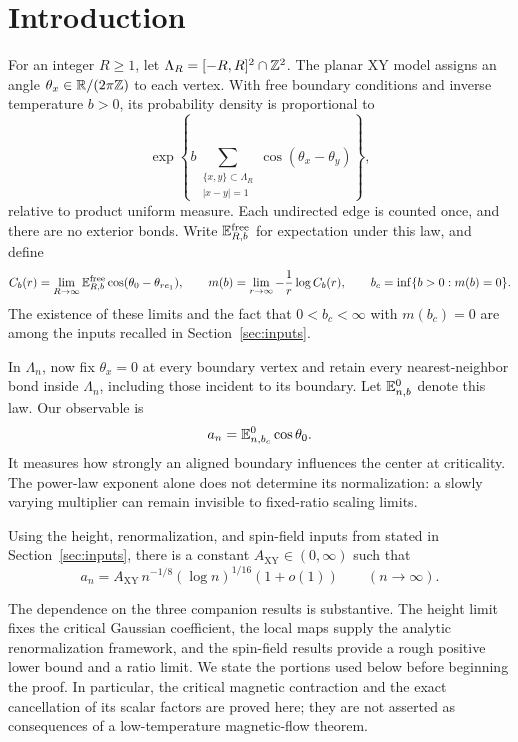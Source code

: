 \section{Introduction}\label{sec:introduction}

For an integer \(R\geq1\), let
\(\Lambda_R=[-R,R]^2\cap\mathbb Z^2\). The planar XY model assigns an angle
\(\theta_x\in\mathbb R/(2\pi\mathbb Z)\) to each vertex. With free boundary conditions
and inverse temperature \(b>0\), its probability density is proportional to
\[
 \exp\left\{b\sum_{\substack{\{x,y\}\subset\Lambda_R\\|x-y|=1}}
                      \cos(\theta_x-\theta_y)\right\},
\]
relative to product uniform measure. Each undirected edge is counted once,
and there are no exterior bonds. Write \(\mathbb E^{\mathrm{free}}_{R,b}\) for
expectation under this law, and define
\begin{equation}\label{eq:intro-threshold}
 C_b(r)=\lim_{R\to\infty}\mathbb E^{\mathrm{free}}_{R,b}
       \cos(\theta_0-\theta_{re_1}),\qquad
 m(b)=\lim_{r\to\infty}-\frac{1}{r}\log C_b(r),\qquad
 b_c=\inf\{b>0:m(b)=0\}.
\end{equation}
The existence of these limits and the fact that \(0<b_c<\infty\) with
\(m(b_c)=0\) are among the inputs recalled in Section~\ref{sec:inputs}.

In \(\Lambda_n\), now fix \(\theta_x=0\) at every boundary vertex and
retain every nearest-neighbor bond inside \(\Lambda_n\), including those
incident to its boundary. Let \(\mathbb E^0_{n,b}\) denote this law. Our observable is
\[
                         a_n=\mathbb E^0_{n,b_c}\cos\theta_0.
\]
It measures how strongly an aligned boundary influences the center at
criticality. The power-law exponent alone does not determine its
normalization: a slowly varying multiplier can remain invisible to
fixed-ratio scaling limits.

\begin{theorem}\label{thm:main}
Using the height, renormalization, and spin-field inputs from
\cite{B,X,S} stated in Section~\ref{sec:inputs}, there is a constant
\(A_{\mathrm{XY}}\in(0,\infty)\) such that
\begin{equation}\label{eq:main}
 a_n=A_{\mathrm{XY}}\,n^{-1/8}(\log n)^{1/16}(1+o(1))
                       \qquad(n\to\infty).
\end{equation}
\end{theorem}

The dependence on the three companion results is substantive. The height
limit fixes the critical Gaussian coefficient, the local maps supply the
analytic renormalization framework, and the spin-field results provide
a rough positive lower bound and a ratio limit. We state the portions
used below before beginning the proof. In particular, the critical
magnetic contraction and the exact cancellation of its scalar factors
are proved here; they are not asserted as consequences of a
low-temperature magnetic-flow theorem.

